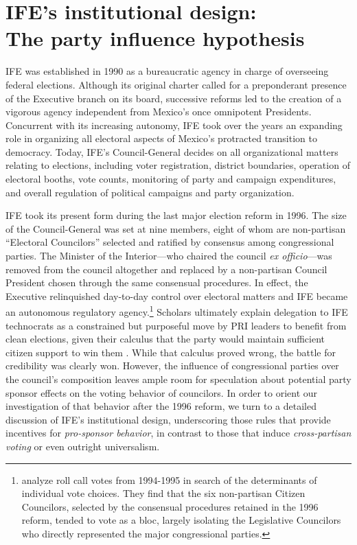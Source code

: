 \documentclass[12 pt, letter]{article}
\begin{document}
\singlespacing
\section{IFE's institutional design:\\  The party influence hypothesis}\label{S:description}
\doublespacing

IFE was established in 1990 as a bureaucratic agency in charge of
overseeing federal elections.  Although its original charter called
for a preponderant presence of the Executive branch on its board,
successive reforms led to the creation of a vigorous agency
independent from Mexico's once omnipotent Presidents. Concurrent
with its increasing autonomy, IFE took over the years an expanding
role in organizing all electoral aspects of Mexico's protracted
transition to democracy.  Today, IFE's Council-General decides on
all organizational matters relating to elections, including voter
registration, district boundaries, operation of electoral booths,
vote counts, monitoring of party and campaign expenditures, and
overall regulation of political campaigns and party organization.

IFE took its present form during the last major election reform in
1996.  The size of the Council-General was set at nine members,
eight of whom are non-partisan ``Electoral Councilors'' selected and
ratified by consensus among congressional parties.  The Minister of
the Interior---who chaired the council \emph{ex officio}---was
removed from the council altogether and replaced by a non-partisan
Council President chosen through the same consensual procedures.  In
effect, the Executive relinquished day-to-day control over electoral
matters and IFE became an autonomous regulatory
agency.\footnote{\citet{Malo1996} analyze roll call votes from
1994-1995 in search of the determinants of individual vote choices.
They find that the six non-partisan Citizen Councilors, selected by
the consensual procedures retained in the 1996 reform, tended to
vote as a bloc, largely isolating the Legislative Councilors who
directly represented the major congressional parties.} Scholars
ultimately explain delegation to IFE technocrats as a constrained
but purposeful move by PRI leaders to benefit from clean elections,
given their calculus that the party would maintain sufficient
citizen support to win them \citep{Magaloni2006}.  While that
calculus proved wrong, the battle for credibility was clearly won.
However, the influence of congressional parties over the council's
composition leaves ample room for speculation about potential party
sponsor effects on the voting behavior of councilors.  In order to
orient our investigation of that behavior after the 1996 reform, we
turn to a detailed discussion of IFE's institutional design,
underscoring those rules that provide incentives for
\emph{pro-sponsor behavior}, in contrast to those that induce
\emph{cross-partisan voting} or even outright universalism.
\end{document}
